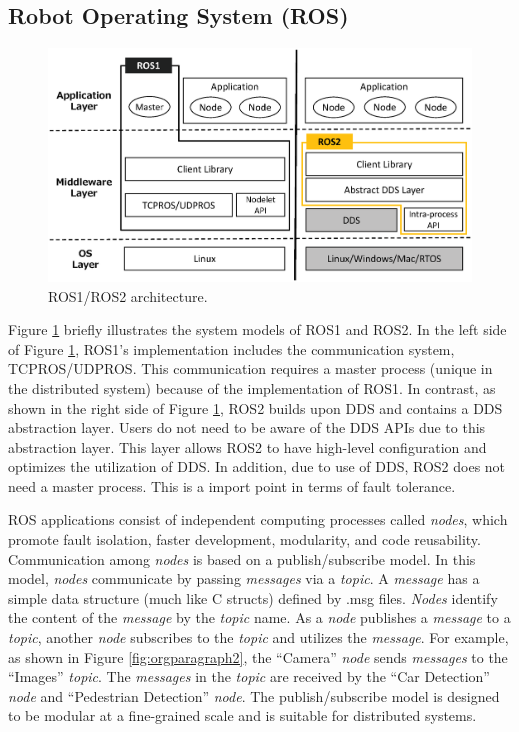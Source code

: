 \documentclass{sig-alternate-05-2015}
\begin{document}
\subsection{Robot Operating System (ROS)}
\label{sec:orgheadline6}

\begin{figure}[t]
\centering
\includegraphics[width=1.0\linewidth]{../figure/ros_architecture.eps}
\caption{\label{fig:orgparagraph1}
ROS1/ROS2 architecture.}
\end{figure}   

Figure \ref{fig:orgparagraph1} briefly illustrates the system models of ROS1 and ROS2. 
In the left side of Figure \ref{fig:orgparagraph1}, ROS1's implementation includes the communication system, TCPROS/UDPROS. 
This communication requires a master process (unique in the distributed system) because of the implementation of ROS1.
In contrast, as shown in the right side of Figure \ref{fig:orgparagraph1}, ROS2 builds upon DDS and contains a DDS abstraction layer. 
Users do not need to be aware of the DDS APIs due to this abstraction layer.
This layer allows ROS2 to have high-level configuration and optimizes the utilization of DDS. 
In addition, due to use of DDS, ROS2 does not need a master process.
This is a import point in terms of fault tolerance.

ROS applications consist of independent computing processes called \emph{nodes}, which promote fault isolation, faster development, modularity, and code reusability. 
Communication among \emph{nodes} is based on a publish/subscribe model. 
In this model, \emph{nodes} communicate by passing \emph{messages} via a \emph{topic}. 
A \emph{message} has a simple data structure (much like C structs) defined by .msg files.
\emph{Nodes} identify the content of the \emph{message} by the \emph{topic} name.
As a \emph{node} publishes a \emph{message} to a \emph{topic}, another \emph{node} subscribes to the \emph{topic} and utilizes the \emph{message}. 
For example, as shown in Figure \ref{fig:orgparagraph2}, the ``Camera'' \emph{node} sends \emph{messages} to the ``Images'' \emph{topic}. 
The \emph{messages} in the \emph{topic} are received by the ``Car Detection'' \emph{node}  and ``Pedestrian Detection'' \emph{node}.
The publish/subscribe model is designed to be modular at a fine-grained scale and is suitable for distributed systems.
\end{document}
